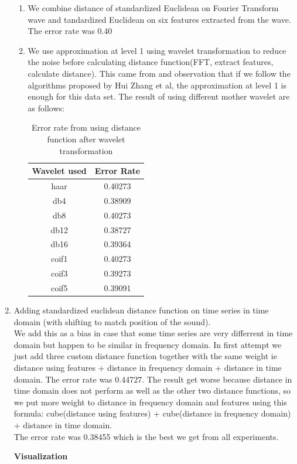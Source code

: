 \begin{enumerate}
\begin{enumerate}
\item 
We combine distance of standardized Euclidean on Fourier Transform wave and tandardized Euclidean on six features extracted from the wave. The error rate was 0.40
\item
We use approximation at level 1 using wavelet transformation to reduce the noise before calculating distance function(FFT, extract features, calculate distance). This came from and observation that if we follow the algorithms proposed by Hui Zhang et al, the approximation at level 1 is enough for this data set. The result of using different mother wavelet are as follows:
\begin{table}[H]
\caption{Error rate from using distance function after wavelet transformation}
\centering 
\begin{tabular}{c c}
\hline\hline 
Wavelet used & Error Rate\\[0.5ex] 
\hline
    haar & 0.40273 \\
    db4 & 0.38909 \\
    db8 & 0.40273 \\
    db12 & 0.38727 \\
    db16 & 0.39364 \\
    coif1 & 0.40273 \\
    coif3 & 0.39273 \\
    coif5 & 0.39091 \\ [1ex]
 
\hline
\end{tabular}
\end{table}
\end{enumerate}

\item Adding standardized euclidean distance function on time series in time domain (with shifting to match position of the sound).\\ We add this as a bias in case that some time series are very differrent in time domain but happen to be similar in frequency domain. In first attempt we just add three custom distance function together with the same weight ie distance using features + distance in frequency domain + distance in time domain. The error rate was 0.44727. The result get worse because distance in time domain does not perform as well as the other two distance functions, so we put more weight to distance in frequency domain and features using this formula: cube(distance using features) + cube(distance in frequency domain) + distance in time domain. \\The error rate was 0.38455 which is the best we get from all experiments.
\begin{flushleft}
\textbf{Visualization}\\
\end{flushleft}


\end{enumerate}
